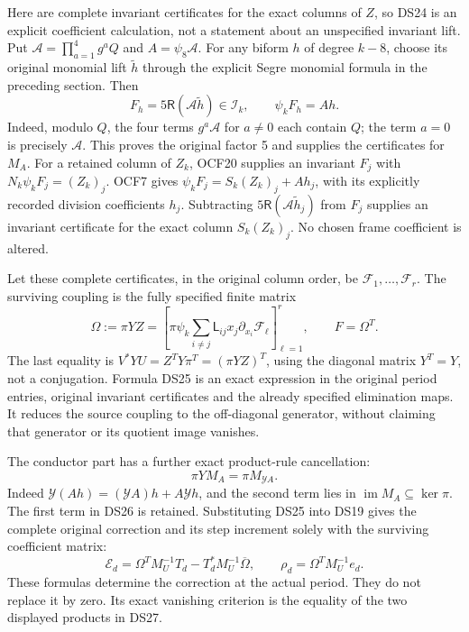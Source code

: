 Here are complete invariant certificates for the exact columns of
\(Z\), so DS24 is an explicit coefficient calculation, not a
statement about an unspecified invariant lift. Put
\(\mathcal A=\prod_{a=1}^4g^aQ\) and
\(A=\psi_8\mathcal A\). For any biform \(h\) of degree \(k-8\),
choose its original monomial lift \(\widetilde h\) through the explicit
Segre monomial formula in the preceding section. Then
\[
F_h=5\mathsf R(\mathcal A\widetilde h)\in\mathscr I_k,
\qquad\psi_kF_h=A h.
\]
Indeed, modulo \(Q\), the four terms \(g^a\mathcal A\) for
\(a\ne0\) each contain \(Q\); the term \(a=0\) is precisely
\(\mathcal A\). This proves the original factor 5 and supplies the
certificates for \(M_A\). For a retained column of \(Z_k\), OCF20
supplies an invariant \(F_j\) with
\(N_k\psi_kF_j=(Z_k)_j\). OCF7 gives
\(\psi_kF_j=S_k(Z_k)_j+A h_j\), with its explicitly recorded
division coefficients \(h_j\). Subtracting
\(5\mathsf R(\mathcal A\widetilde h_j)\) from \(F_j\) supplies
an invariant certificate for the exact column \(S_k(Z_k)_j\).
No chosen frame coefficient is altered.

Let these complete certificates, in the original column order, be
\(\mathcal F_1,\ldots,\mathcal F_r\). The surviving coupling is the
fully specified finite matrix
\begin{equation}\label{dsroot:eq:omega}
\boxed{\Omega:=\pi YZ
=\left[\pi\psi_k
 \sum_{i\ne j}\mathsf L_{ij}x_j\partial_{x_i}\mathcal F_\ell
 \right]_{\ell=1}^r,
\qquad F=\Omega^T.}
\tag{DS25}
\end{equation}
The last equality is \(V^*YU=Z^TY\pi^T=(\pi YZ)^T\), using
the diagonal matrix \(Y^T=Y\), not a conjugation. Formula DS25 is
an exact expression in the original period entries, original invariant
certificates and the already specified elimination maps. It reduces
the source coupling to the off-diagonal generator, without claiming
that generator or its quotient image vanishes.

The conductor part has a further exact product-rule cancellation:
\begin{equation}\label{dsroot:eq:conductor-cancel}
\pi Y M_A=\pi M_{\mathcal Y A}.
\tag{DS26}
\end{equation}
Indeed \(\mathcal Y(Ah)=(\mathcal YA)h+A\mathcal Yh\), and the
second term lies in \(\operatorname{im}M_A\subseteq\ker\pi\).
The first term in DS26 is retained. Substituting DS25 into DS19 gives
the complete original correction and its step increment solely with
the surviving coefficient matrix:
\begin{equation}\label{dsroot:eq:omega-correction}
\mathcal E_d=\Omega^TM_U^{-1}T_d-T_d^*M_U^{-1}\overline\Omega,
\qquad \rho_d=\Omega^TM_U^{-1}e_d.
\tag{DS27}
\end{equation}
These formulas determine the correction at the actual period. They do
not replace it by zero. Its exact vanishing criterion is the equality
of the two displayed products in DS27.

